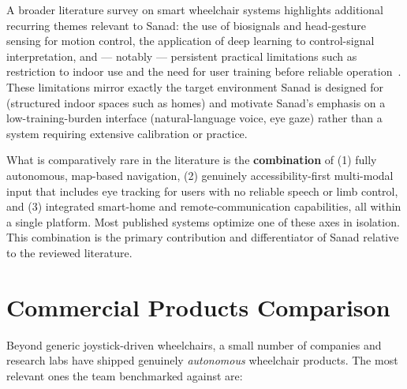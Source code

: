 A broader literature survey on smart wheelchair systems highlights additional recurring themes relevant to Sanad: the use of biosignals and head-gesture sensing for motion control, the application of deep learning to control-signal interpretation, and --- notably --- persistent practical limitations such as restriction to indoor use and the need for user training before reliable operation~\cite{arxiv2023smartwheelchairreview}. These limitations mirror exactly the target environment Sanad is designed for (structured indoor spaces such as homes) and motivate Sanad's emphasis on a low-training-burden interface (natural-language voice, eye gaze) rather than a system requiring extensive calibration or practice.

What is comparatively rare in the literature is the \textbf{combination} of (1) fully autonomous, map-based navigation, (2) genuinely accessibility-first multi-modal input that includes eye tracking for users with no reliable speech or limb control, and (3) integrated smart-home and remote-communication capabilities, all within a single platform. Most published systems optimize one of these axes in isolation. This combination is the primary contribution and differentiator of Sanad relative to the reviewed literature.

\section{Commercial Products Comparison}

Beyond generic joystick-driven wheelchairs, a small number of companies and research labs have shipped genuinely \emph{autonomous} wheelchair products. The most relevant ones the team benchmarked against are:

